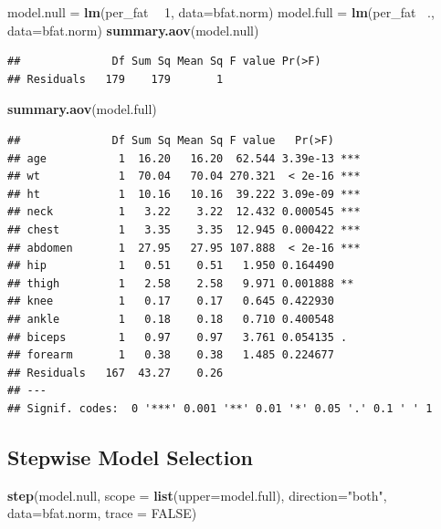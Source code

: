 \documentclass[]{article}
\newenvironment{Shaded}{\begin{snugshade}}{\end{snugshade}}
\newcommand{\KeywordTok}[1]{\textcolor[rgb]{0.13,0.29,0.53}{\textbf{#1}}}
\newcommand{\DataTypeTok}[1]{\textcolor[rgb]{0.13,0.29,0.53}{#1}}
\newcommand{\DecValTok}[1]{\textcolor[rgb]{0.00,0.00,0.81}{#1}}
\newcommand{\StringTok}[1]{\textcolor[rgb]{0.31,0.60,0.02}{#1}}
\newcommand{\OtherTok}[1]{\textcolor[rgb]{0.56,0.35,0.01}{#1}}
\newcommand{\OperatorTok}[1]{\textcolor[rgb]{0.81,0.36,0.00}{\textbf{#1}}}
\newcommand{\NormalTok}[1]{#1}
\begin{document}
\begin{Shaded}
\begin{Highlighting}[]
\NormalTok{model.null =}\StringTok{ }\KeywordTok{lm}\NormalTok{(per_fat }\OperatorTok{~}\StringTok{ }\DecValTok{1}\NormalTok{, }\DataTypeTok{data=}\NormalTok{bfat.norm)}
\NormalTok{model.full =}\StringTok{ }\KeywordTok{lm}\NormalTok{(per_fat }\OperatorTok{~}\NormalTok{., }\DataTypeTok{data=}\NormalTok{bfat.norm)}
\KeywordTok{summary.aov}\NormalTok{(model.null)}
\end{Highlighting}
\end{Shaded}

\begin{verbatim}
##              Df Sum Sq Mean Sq F value Pr(>F)
## Residuals   179    179       1
\end{verbatim}

\begin{Shaded}
\begin{Highlighting}[]
\KeywordTok{summary.aov}\NormalTok{(model.full)}
\end{Highlighting}
\end{Shaded}

\begin{verbatim}
##              Df Sum Sq Mean Sq F value   Pr(>F)    
## age           1  16.20   16.20  62.544 3.39e-13 ***
## wt            1  70.04   70.04 270.321  < 2e-16 ***
## ht            1  10.16   10.16  39.222 3.09e-09 ***
## neck          1   3.22    3.22  12.432 0.000545 ***
## chest         1   3.35    3.35  12.945 0.000422 ***
## abdomen       1  27.95   27.95 107.888  < 2e-16 ***
## hip           1   0.51    0.51   1.950 0.164490    
## thigh         1   2.58    2.58   9.971 0.001888 ** 
## knee          1   0.17    0.17   0.645 0.422930    
## ankle         1   0.18    0.18   0.710 0.400548    
## biceps        1   0.97    0.97   3.761 0.054135 .  
## forearm       1   0.38    0.38   1.485 0.224677    
## Residuals   167  43.27    0.26                     
## ---
## Signif. codes:  0 '***' 0.001 '**' 0.01 '*' 0.05 '.' 0.1 ' ' 1
\end{verbatim}

\subsection{Stepwise Model Selection}\label{stepwise-model-selection}

\begin{Shaded}
\begin{Highlighting}[]
\KeywordTok{step}\NormalTok{(model.null,}
     \DataTypeTok{scope =} \KeywordTok{list}\NormalTok{(}\DataTypeTok{upper=}\NormalTok{model.full),}
     \DataTypeTok{direction=}\StringTok{"both"}\NormalTok{, }\DataTypeTok{data=}\NormalTok{bfat.norm, }\DataTypeTok{trace =} \OtherTok{FALSE}\NormalTok{)  }
\end{Highlighting}
\end{Shaded}
\end{document}
